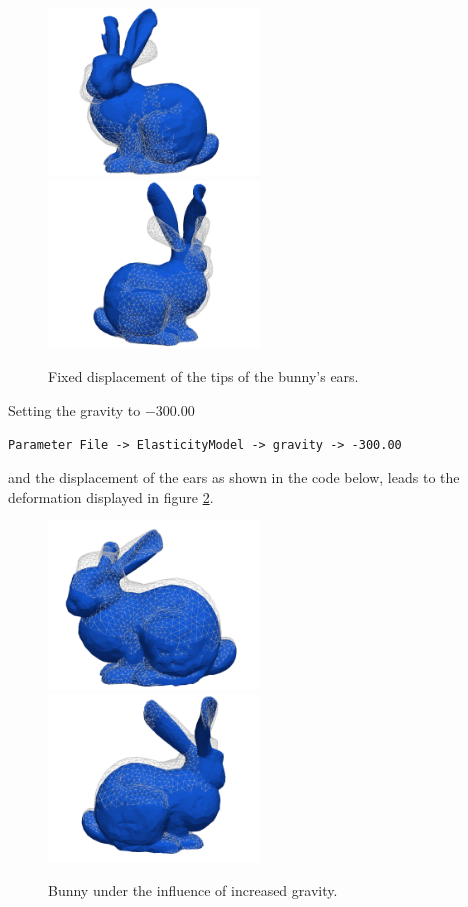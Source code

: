 \documentclass[a4paper, 11pt, twoside]{article}
\theoremstyle{plain}
\theoremstyle{definition}
\begin{document}
\begin{figure}[htb]
\centering
\includegraphics[width=0.5\textwidth]{bunny_ear_displacement_front.png}
\includegraphics[width=0.5\textwidth]{bunny_ear_displacement_back.png}
\caption{Fixed displacement of the tips of the bunny's ears.}
\label{fig:bunny_ear_displacement}
\end{figure}

Setting the gravity to $-300.00$
\begin{lstlisting}[breaklines]
  Parameter File -> ElasticityModel -> gravity -> -300.00
\end{lstlisting}
and the displacement of the ears as shown in the code below, leads to the deformation displayed in figure \ref{fig:bunny_gravity}.
 

\begin{figure}[htb]
\centering
\includegraphics[width=0.5\textwidth]{bunny_gravity_front.png}
\includegraphics[width=0.5\textwidth]{bunny_gravity_back.png}
\caption{Bunny under the influence of increased gravity.}
\label{fig:bunny_gravity}
\end{figure}
\end{document}
